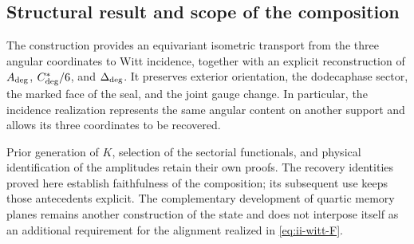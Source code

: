 \subsection{Structural result and scope of the composition}

The construction provides an equivariant isometric transport from
the three angular coordinates to Witt incidence, together with an
explicit reconstruction of \(A_{\rm deg}\), \(C^*_{\rm deg}/6\), and
\(\Delta_{\rm deg}\). It preserves exterior orientation, the
dodecaphase sector, the marked face of the seal, and the joint gauge change.
In particular, the incidence realization represents the same angular
content on another support and allows its three coordinates to be recovered.

Prior generation of \(K\), selection of the sectorial
functionals, and physical identification of the amplitudes retain their
own proofs. The recovery identities proved here
establish faithfulness of the composition; its subsequent use keeps
those antecedents explicit. The complementary development of quartic
memory planes remains another construction of the state and does not
interpose itself as an additional requirement for the alignment realized in
\eqref{eq:ii-witt-F}.
